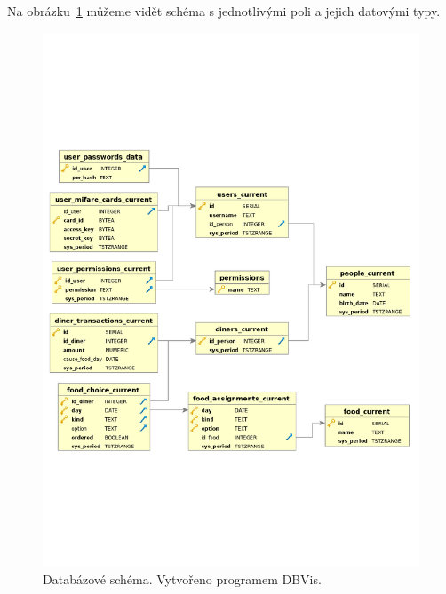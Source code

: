 \noindent Na obrázku~\ref{dbSchema} můžeme vidět schéma s jednotlivými poli a jejich
datovými typy.

\begin{figure}
    \includegraphics[width=140mm]{../img/db-schema}
    \caption{Databázové schéma. Vytvořeno programem DBVis.}
    \label{dbSchema}
\end{figure}
